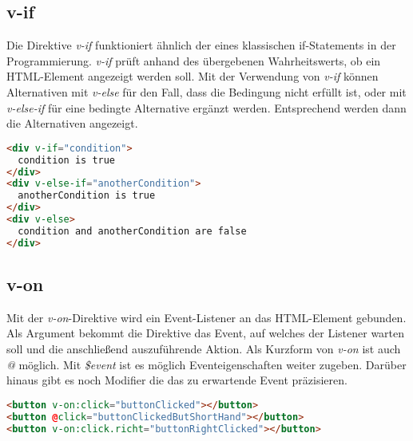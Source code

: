 \subsection*{v-if}
Die Direktive \emph{v-if} funktioniert ähnlich der eines klassischen if-Statements in der Programmierung.
\emph{v-if} prüft anhand des übergebenen Wahrheitswerts, ob ein HTML-Element angezeigt werden soll.
Mit der Verwendung von \emph{v-if} können Alternativen mit \emph{v-else} für den Fall, dass die Bedingung nicht erfüllt ist,
oder mit \emph{v-else-if} für eine bedingte Alternative ergänzt werden.
Entsprechend werden dann die Alternativen angezeigt. \cite{vueDirectives}
\begin{lstlisting}[caption={\emph{v-if}-Direktive},language=html, label={lst:v-if}]
<div v-if="condition">
  condition is true
</div>
<div v-else-if="anotherCondition">
  anotherCondition is true
</div>
<div v-else>
  condition and anotherCondition are false
</div>
\end{lstlisting}

\subsection*{v-on}
Mit der \emph{v-on}-Direktive wird ein Event-Listener an das HTML-Element gebunden.
Als Argument bekommt die Direktive das Event, auf welches der Listener warten soll und
die anschließend auszuführende Aktion.
Als Kurzform von \emph{v-on} ist auch  \emph{@} möglich.
Mit \emph{\$event} ist es möglich Eventeigenschaften weiter zugeben.
Darüber hinaus gibt es noch Modifier die das zu erwartende Event präzisieren. \cite{vueDirectives}
\begin{lstlisting}[caption={\emph{v-on}-Direktive},language=html, label={lst:v-on}]
<button v-on:click="buttonClicked"></button>
<button @click="buttonClickedButShortHand"></button>
<button v-on:click.richt="buttonRightClicked"></button>
\end{lstlisting}

\newpage

